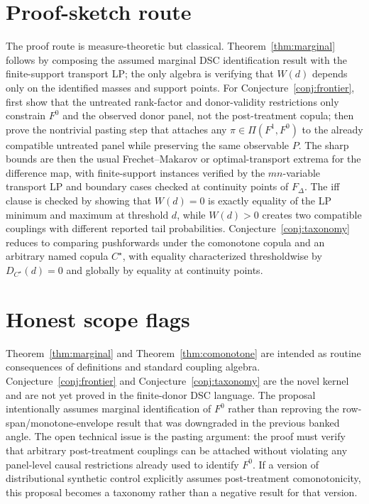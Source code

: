 \documentclass[11pt]{article}
\theoremstyle{definition}
\theoremstyle{plain}
\theoremstyle{remark}
\begin{document}
\section{Proof-sketch route}
The proof route is measure-theoretic but classical.  Theorem~\ref{thm:marginal} follows by composing the assumed marginal DSC identification result with the finite-support transport LP; the only algebra is verifying that \(W(d)\) depends only on the identified masses and support points.  For Conjecture~\ref{conj:frontier}, first show that the untreated rank-factor and donor-validity restrictions only constrain \(F^0\) and the observed donor panel, not the post-treatment copula; then prove the nontrivial pasting step that attaches any \(\pi\in\Pi(F^1,F^0)\) to the already compatible untreated panel while preserving the same observable \(P\).  The sharp bounds are then the usual Frechet--Makarov or optimal-transport extrema for the difference map, with finite-support instances verified by the \(mn\)-variable transport LP and boundary cases checked at continuity points of \(F_\Delta\).  The iff clause is checked by showing that \(W(d)=0\) is exactly equality of the LP minimum and maximum at threshold \(d\), while \(W(d)>0\) creates two compatible couplings with different reported tail probabilities.  Conjecture~\ref{conj:taxonomy} reduces to comparing pushforwards under the comonotone copula and an arbitrary named copula \(C^\star\), with equality characterized thresholdwise by \(D_{C^\star}(d)=0\) and globally by equality at continuity points.

\section{Honest scope flags}
Theorem~\ref{thm:marginal} and Theorem~\ref{thm:comonotone} are intended as routine consequences of definitions and standard coupling algebra.  Conjecture~\ref{conj:frontier} and Conjecture~\ref{conj:taxonomy} are the novel kernel and are not yet proved in the finite-donor DSC language.  The proposal intentionally assumes marginal identification of \(F^0\) rather than reproving the row-span/monotone-envelope result that was downgraded in the previous banked angle.  The open technical issue is the pasting argument: the proof must verify that arbitrary post-treatment couplings can be attached without violating any panel-level causal restrictions already used to identify \(F^0\).  If a version of distributional synthetic control explicitly assumes post-treatment comonotonicity, this proposal becomes a taxonomy rather than a negative result for that version.
\end{document}
